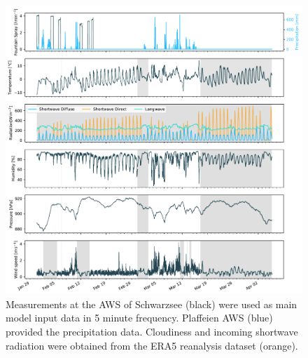 \documentclass[utf8]{frontiersSCNS} %
\begin{document}
\begin{figure} \centering \includegraphics[width=\linewidth]{./Figures/Figure_3} \caption{Measurements at the AWS
  of Schwarzsee (black) were used as main model input data in 5 minute frequency. Plaffeien AWS (blue) provided the
precipitation data.  Cloudiness and incoming shortwave radiation were obtained from the ERA5 reanalysis dataset
(orange).} \label{fig:input} \end{figure}
\end{document}
